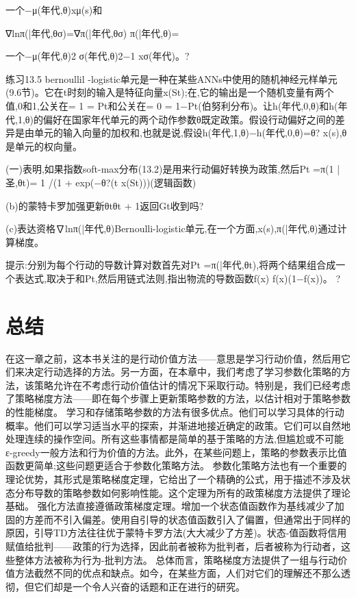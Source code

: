 一个−μ(年代,θ)xμ(s)和

∇lnπ(|年代,θσ)=∇π(|年代,θσ)
π(|年代,θ)=

一个−μ(年代,θ)2
σ(年代,θ)2−1
xσ(年代)。?

练习13.5 bernoullil -logistic单元是一种在某些ANNs中使用的随机神经元样单元(9.6节)。它在t时刻的输入是特征向量x(St);在,它的输出是一个随机变量有两个值,0和1,公关在= { 1 } = Pt和公关在= { 0 } = 1−Pt(伯努利分布)。让h(年代,0,θ)和h(年代,1,θ)的偏好在国家年代单元的两个动作参数θ既定政策。假设行动偏好之间的差异是由单元的输入向量的加权和,也就是说,假设h(年代,1,θ)−h(年代,0,θ)=θ? x(s),θ是单元的权向量。

(一)表明,如果指数soft-max分布(13.2)是用来行动偏好转换为政策,然后Pt =π(1 |圣,θt)= 1 /(1 + exp(−θ?(t x(St)))(逻辑函数)

(b)的蒙特卡罗加强更新θtθt + 1返回Gt收到吗?

(c)表达资格∇lnπ(|年代,θ)Bernoulli-logistic单元,在一个方面,x(s),π(|年代,θ)通过计算梯度。

提示:分别为每个行动的导数计算对数首先对Pt =π(|年代,θt),将两个结果组合成一个表达式,取决于和Pt,然后用链式法则,指出物流的导数函数f(x)
f(x)(1−f(x))。 					?

\section{总结}

在这一章之前，这本书关注的是行动价值方法——意思是学习行动价值，然后用它们来决定行动选择的方法。另一方面，在本章中，我们考虑了学习参数化策略的方法，该策略允许在不考虑行动价值估计的情况下采取行动。特别是，我们已经考虑了策略梯度方法——即在每个步骤上更新策略参数的方法，以估计相对于策略参数的性能梯度。
学习和存储策略参数的方法有很多优点。他们可以学习具体的行动概率。他们可以学习适当水平的探索，并渐进地接近确定的政策。它们可以自然地处理连续的操作空间。所有这些事情都是简单的基于策略的方法,但尴尬或不可能ε-greedy一般方法和行为价值的方法。此外，在某些问题上，策略的参数表示比值函数更简单;这些问题更适合于参数化策略方法。
参数化策略方法也有一个重要的理论优势，其形式是策略梯度定理，它给出了一个精确的公式，用于描述不涉及状态分布导数的策略参数如何影响性能。这个定理为所有的政策梯度方法提供了理论基础。
强化方法直接遵循政策梯度定理。增加一个状态值函数作为基线减少了加固的方差而不引入偏差。使用自引导的状态值函数引入了偏置，但通常出于同样的原因，引导TD方法往往优于蒙特卡罗方法(大大减少了方差)。状态-值函数将信用赋值给批判——政策的行为选择，因此前者被称为批判者，后者被称为行动者，这些整体方法被称为行为-批判方法。
总体而言，策略梯度方法提供了一组与行动价值方法截然不同的优点和缺点。如今，在某些方面，人们对它们的理解还不那么透彻，但它们却是一个令人兴奋的话题和正在进行的研究。


